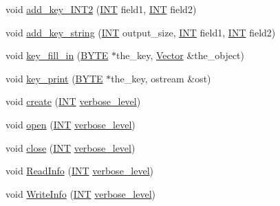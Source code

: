 \begin{DoxyCompactItemize}
void \mbox{\hyperlink{classbtree_a4d0d3b843c9ae081d5fc0325dbdddea7}{add\+\_\+key\+\_\+\+I\+N\+T2}} (\mbox{\hyperlink{galois_8h_a09fddde158a3a20bd2dcadb609de11dc}{I\+NT}} field1, \mbox{\hyperlink{galois_8h_a09fddde158a3a20bd2dcadb609de11dc}{I\+NT}} field2)
\item 
void \mbox{\hyperlink{classbtree_a291b3c61b9df78471a385b990e926d66}{add\+\_\+key\+\_\+string}} (\mbox{\hyperlink{galois_8h_a09fddde158a3a20bd2dcadb609de11dc}{I\+NT}} output\+\_\+size, \mbox{\hyperlink{galois_8h_a09fddde158a3a20bd2dcadb609de11dc}{I\+NT}} field1, \mbox{\hyperlink{galois_8h_a09fddde158a3a20bd2dcadb609de11dc}{I\+NT}} field2)
\item 
void \mbox{\hyperlink{classbtree_ae75d5ef9677891b93960a55dffdc6eb2}{key\+\_\+fill\+\_\+in}} (\mbox{\hyperlink{galois_8h_ab6cc7b4aeb6ea31aba2b3fbfc83ff5e6}{B\+Y\+TE}} $\ast$the\+\_\+key, \mbox{\hyperlink{class_vector}{Vector}} \&the\+\_\+object)
\item 
void \mbox{\hyperlink{classbtree_a4d527d5afa4891a2fa69fc1a07c48627}{key\+\_\+print}} (\mbox{\hyperlink{galois_8h_ab6cc7b4aeb6ea31aba2b3fbfc83ff5e6}{B\+Y\+TE}} $\ast$the\+\_\+key, ostream \&ost)
\item 
void \mbox{\hyperlink{classbtree_ae46050f7dc1057d21cddcd6b2e3496d9}{create}} (\mbox{\hyperlink{galois_8h_a09fddde158a3a20bd2dcadb609de11dc}{I\+NT}} \mbox{\hyperlink{simeon_8_c_a818073fbcc2f439e7c56952f67386122}{verbose\+\_\+level}})
\item 
void \mbox{\hyperlink{classbtree_a3e718949f1be6057839463292a60297a}{open}} (\mbox{\hyperlink{galois_8h_a09fddde158a3a20bd2dcadb609de11dc}{I\+NT}} \mbox{\hyperlink{simeon_8_c_a818073fbcc2f439e7c56952f67386122}{verbose\+\_\+level}})
\item 
void \mbox{\hyperlink{classbtree_acdd59b8696e09dc1c76356902fb35cbd}{close}} (\mbox{\hyperlink{galois_8h_a09fddde158a3a20bd2dcadb609de11dc}{I\+NT}} \mbox{\hyperlink{simeon_8_c_a818073fbcc2f439e7c56952f67386122}{verbose\+\_\+level}})
\item 
void \mbox{\hyperlink{classbtree_a482ac8e066ebb0c408b3cc92fc08258c}{Read\+Info}} (\mbox{\hyperlink{galois_8h_a09fddde158a3a20bd2dcadb609de11dc}{I\+NT}} \mbox{\hyperlink{simeon_8_c_a818073fbcc2f439e7c56952f67386122}{verbose\+\_\+level}})
\item 
void \mbox{\hyperlink{classbtree_a4a8cdbdf67d06dc6caa53f3a9c83706a}{Write\+Info}} (\mbox{\hyperlink{galois_8h_a09fddde158a3a20bd2dcadb609de11dc}{I\+NT}} \mbox{\hyperlink{simeon_8_c_a818073fbcc2f439e7c56952f67386122}{verbose\+\_\+level}})
\item 

\end{DoxyCompactItemize}
